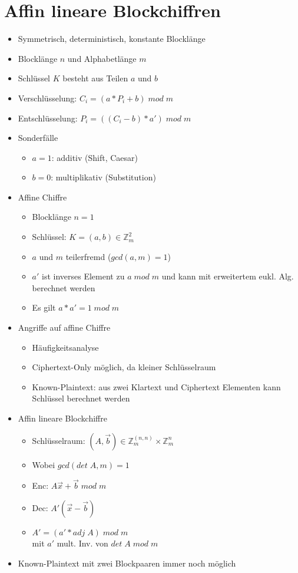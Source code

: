 \documentclass[11pt, paper=a4, twocolumn]{scrartcl}
\newcommand*{\Z}{\mathbb{Z}}
\begin{document}
	\section{Affin lineare Blockchiffren}
		\begin{itemize}
			\item Symmetrisch, deterministisch, konstante Blocklänge
			\item Blocklänge $n$ und Alphabetlänge $m$
			\item Schlüssel $K$ besteht aus Teilen $a$ und $b$
			\item Verschlüsselung: $C_i=(a*P_i+b)\;mod\;m$
			\item Entschlüsselung: $P_i=((C_i-b)*a')\;mod\;m$
			\item Sonderfälle
				\begin{itemize}
					\item $a=1$: additiv (Shift, Caesar)
					\item $b=0$: multiplikativ (Substitution)
				\end{itemize}
			\item Affine Chiffre
				\begin{itemize}
					\item Blocklänge $n=1$
					\item Schlüssel: $K=(a,b)\in \Z_m^2$
					\item $a$ und $m$ teilerfremd ($gcd(a,m)=1$)
					\item $a'$ ist inverses Element zu $a\;mod\;m$ und kann mit erweitertem eukl. Alg. berechnet werden
					\item Es gilt $a*a'=1\;mod\;m$
				\end{itemize}
			\item Angriffe auf affine Chiffre
				\begin{itemize}
					\item Häufigkeitsanalyse
					\item Ciphertext-Only möglich, da kleiner Schlüsselraum
					\item Known-Plaintext: aus zwei Klartext und Ciphertext Elementen kann Schlüssel berechnet werden
				\end{itemize}
			\item Affin lineare Blockchiffre
				\begin{itemize}
					\item Schlüsselraum: $(A,\vec{b})\in \Z_m^{(n,n)}\times \Z_m^n$
					\item Wobei $gcd(det\;A,m)=1$
					\item Enc: $A\vec{x}+\vec{b}\;mod\;m$
					\item Dec: $A'(\vec{x}-\vec{b})$
					\item $A'=(a'*adj\;A)\;mod\;m$\\
						mit $a'$ mult. Inv. von $det\;A\;mod\;m$
				\end{itemize}
			\item Known-Plaintext mit zwei Blockpaaren immer noch möglich
		\end{itemize}
	
\end{document}
